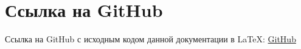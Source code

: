 \documentclass[a4paper,12pt]{report}
\begin{document}
	
	\newpage
	\section{Ссылка на GitHub}
	Ссылка на GitHub с исходным кодом данной документации в \LaTeX: \href{https://github.com/argilmutdinov/ISRPO_LaTeX_lab}{GitHub}
	
	
	
	
	
	
	
	
	
	
	
	
	
	
	
	
	
	
\end{document}
